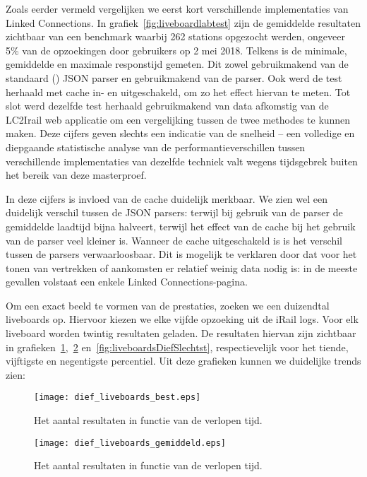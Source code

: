 Zoals eerder vermeld vergelijken we eerst kort verschillende implementaties van Linked Connections. In grafiek~\ref{fig:liveboardlabtest} zijn de gemiddelde resultaten zichtbaar van een benchmark waarbij 262 stations opgezocht werden, ongeveer 5\% van de opzoekingen door gebruikers op 2 mei 2018. Telkens is de minimale, gemiddelde en maximale responstijd gemeten. Dit zowel gebruikmakend van de standaard () JSON parser en gebruikmakend van de  parser. Ook werd de test herhaald met cache in- en uitgeschakeld, om zo het effect hiervan te meten. Tot slot werd dezelfde test herhaald gebruikmakend van data afkomstig van de LC2Irail web applicatie om een vergelijking tussen de twee methodes te kunnen maken. Deze cijfers geven slechts een indicatie van de snelheid -- een volledige en diepgaande statistische analyse van de performantieverschillen tussen verschillende implementaties van dezelfde techniek valt wegens tijdsgebrek buiten het bereik van deze masterproef.

In deze cijfers is invloed van de cache duidelijk merkbaar. We zien wel een duidelijk verschil tussen de JSON parsers: terwijl bij gebruik van de  parser de gemiddelde laadtijd bijna halveert, terwijl het effect van de cache bij het gebruik van de  parser veel kleiner is. Wanneer de cache uitgeschakeld is is het verschil tussen de parsers verwaarloosbaar. Dit is mogelijk te verklaren door dat voor het tonen van vertrekken of aankomsten er relatief weinig data nodig is: in de meeste gevallen volstaat een enkele Linked Connections-pagina.

Om een exact beeld te vormen van de prestaties, zoeken we een duizendtal liveboards op. Hiervoor kiezen we elke vijfde opzoeking uit de iRail logs. Voor elk liveboard worden twintig resultaten geladen. De resultaten hiervan zijn zichtbaar in grafieken~\ref{fig:liveboardsDiefBest},~\ref{fig:liveboardsDiefAvg} en~\ref{fig:liveboardsDiefSlechtst}, respectievelijk voor het tiende, vijftigste en negentigste percentiel. Uit deze grafieken kunnen we duidelijke trends zien:

\begin{figure}[h]
	\centering
	\texttt{[image: dief\_liveboards\_best.eps]}
	\caption[Aantal resultaten liveboards in functie van de tijd]{Het aantal resultaten in functie van de verlopen tijd.}
	\label{fig:liveboardsDiefBest}
\end{figure}

\begin{figure}[h]
	\centering
	\texttt{[image: dief\_liveboards\_gemiddeld.eps]}
	\caption[Aantal resultaten liveboards in functie van de tijd]{Het aantal resultaten in functie van de verlopen tijd.}
	\label{fig:liveboardsDiefAvg}
\end{figure}

